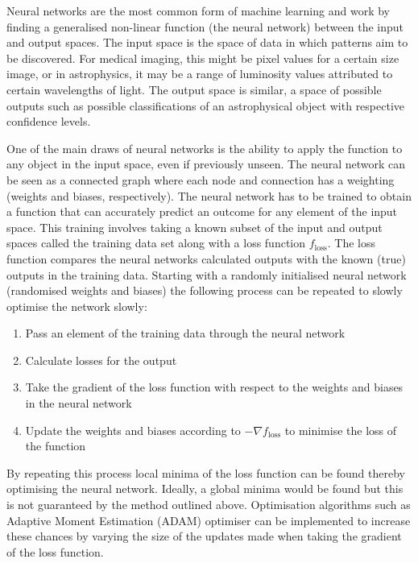 \documentclass[10pt]{iopart}
\begin{document}
Neural networks are the most common form of machine learning and work by finding a generalised non-linear function (the neural network) between the input and output spaces. The input space is the space of data in which patterns aim to be discovered. For medical imaging, this might be pixel values for a certain size image, or in astrophysics, it may be a range of luminosity values attributed to certain wavelengths of light. The output space is similar, a space of possible outputs such as possible classifications of an astrophysical object with respective confidence levels.

 One of the main draws of neural networks is the ability to apply the function to any object in the input space, even if previously unseen. The neural network can be seen as a connected graph where each node and connection has a weighting (weights and biases, respectively). The neural network has to be trained to obtain a function that can accurately predict an outcome for any element of the input space. This training involves taking a known subset of the input and output spaces called the training data set along with a loss function $f_{\mathrm{loss}}$. The loss function compares the neural networks calculated outputs with the known (true) outputs in the training data. Starting with a randomly initialised neural network (randomised weights and biases) the following process can be repeated to slowly optimise the network slowly:
 
 \begin{enumerate}
 	\item Pass an element of the training data through the neural network
 	\item Calculate losses for the output
 	\item Take the gradient of the loss function with respect to the weights and biases in the neural network
 	\item Update the weights and biases according to $-\nabla f_{\mathrm{loss}}$ to minimise the loss of the function
 \end{enumerate}
 
By repeating this process local minima of the loss function can be found thereby optimising the neural network. 
Ideally, a global minima would be found but this is not guaranteed by the method outlined above. Optimisation algorithms such as Adaptive Moment Estimation (ADAM) optimiser \cite{ADAM} can be implemented to increase these chances by varying the size of the updates made when taking the gradient of the loss function.
\end{document}
